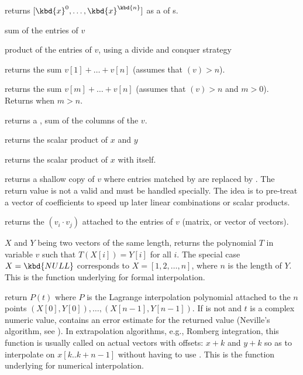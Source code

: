  returns $[\kbd{x}^0,
\dots, \kbd{x}^\kbd{n}]$ as a  of s.

\smallskip

 sum of the entries of $v$

 product of the entries of $v$, using
a divide and conquer strategy

 returns the sum $v[1] + \dots + v[n]$
(assumes that $(v) > n$).

 returns the sum $v[m] + \dots +
v[n]$ (assumes that $(v) > n$ and $m > 0$). Returns 
when $m > n$.

 returns a , sum of the columns of the
 $v$.

 returns the scalar product of $x$ and $y$

 returns the scalar product of $x$ with itself.

 returns a shallow copy of $v$ where entries
matched by  are replaced by . The return value
is not a valid  and must be handled specially. The idea is
to pre-treat a vector of coefficients to speed up later linear combinations
or scalar products.

 returns the  $(v_i\cdot v_j)$
attached to the entries of $v$ (matrix, or vector of vectors).

 $X$ and $Y$ being two vectors of
the same length, returns the polynomial $T$ in variable $v$ such that
$T(X[i]) = Y[i]$ for all $i$. The special case $X = \kbd{NULL}$
corresponds to $X = [1,2,\dots,n]$, where $n$ is the length of $Y$.
This is the function underlying  for formal
interpolation.

return $P(t)$ where $P$ is the Lagrange interpolation polynomial
attached to the $n$ points $(X[0],Y[0]), \dots, (X[n-1],Y[n-1])$.
If  is not  and $t$ is a complex numeric value, 
contains an error estimate for the returned value (Neville's algorithm, see
). In extrapolation algorithms, e.g., Romberg
integration, this function is usually called on actual  vectors
with offsets: $x + k$ and $y + k$ so as to interpolate on $x[k..k+n-1]$
without having to use .
This is the function underlying  for numerical
interpolation.

